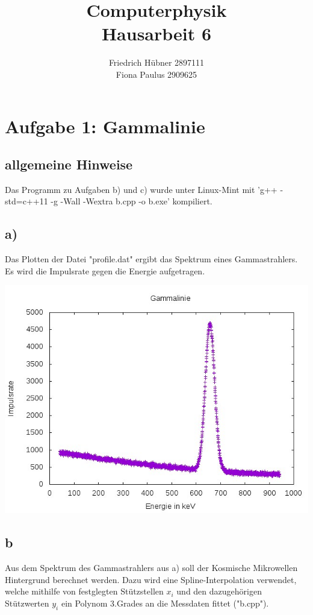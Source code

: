 \documentclass{scrreprt}
\author{Friedrich Hübner 2897111\\
	Fiona Paulus 2909625}
\title{Computerphysik\\Hausarbeit 6}
\begin{document}
	\maketitle
	\newpage
	
\chapter*{Aufgabe 1: Gammalinie}
\section*{allgemeine Hinweise}
Das Programm zu Aufgaben b) und c) wurde unter Linux-Mint mit 'g++ -std=c++11 -g -Wall -Wextra b.cpp -o b.exe' kompiliert.
\section*{a)}
Das Plotten der Datei "profile.dat" ergibt das Spektrum eines Gammastrahlers. Es wird die Impulsrate gegen die Energie aufgetragen.
\begin{center}
	\includegraphics*[scale=0.7]{a.jpeg}
\end{center}

\section*{b}
Aus dem Spektrum des Gammastrahlers aus a) soll der Kosmische Mikrowellen Hintergrund berechnet werden. Dazu wird eine Spline-Interpolation verwendet, welche mithilfe von festglegten Stützstellen $x_i$ und den dazugehörigen Stützwerten $y_i$ ein Polynom 3.Grades an die Messdaten fittet ("b.cpp").
\end{document}
